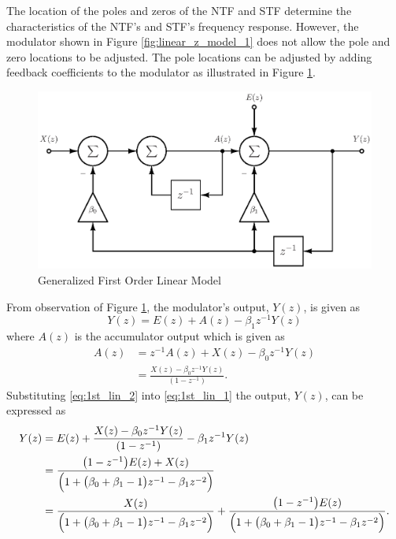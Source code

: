 The location of the poles and zeros of the NTF and STF determine the
characteristics of the NTF's and STF's frequency response. However, the \DS modulator
shown in Figure \ref{fig:linear_z_model_1} does not allow the pole and zero locations to
be adjusted. The pole locations can be adjusted by adding feedback
coefficients to the \DS modulator as illustrated in Figure \ref{fig:linear_z_model_2}.
\begin{figure}[htbp]
 \centering
 \includegraphics{./final_figures/first_order_linear_model.eps}
 \caption{Generalized First Order Linear Model}
 \label{fig:linear_z_model_2}
\end{figure}
From observation of Figure \ref{fig:linear_z_model_2}, the \DS
modulator's output, $Y(z)$, is given as
\begin{equation}\label{eq:1st_lin_1}
 Y(z)=E(z)+A(z)-\beta_{1}z^{-1}Y(z)
\end{equation}
where $A(z)$ is the accumulator output which is given as 
\begin{equation}\label{eq:1st_lin_2}
 \begin{split}
 A(z)& = z^{-1}A(z)+X(z)-\beta_{0}z^{-1}Y(z)\\
      &   = \frac{X(z)-\beta_{0}z^{-1}Y(z)}{\left(1-z^{-1}\right)}\text{.}
 \end{split}
\end{equation}
Substituting \eqref{eq:1st_lin_2} into \eqref{eq:1st_lin_1} the output,
$Y(z)$, can be expressed as 
\begin{equation}\label{eq:1st_lin_3}
  \begin{split}
  Y(z)& =
E(z)+\frac{X(z)-\beta_{0}z^{-1}Y(z)}{\left(1-z^{-1}\right)}-\beta_{1}z^{-1}Y(z)\\
        & =
\frac{\bigl(1-z^{-1}\bigr)E(z)+X(z)}{\Bigl(1+\bigl(\beta_{0}+\beta_{1}-1\bigr)z^{-1}
-\beta_{1}z^{-2}\Bigr)}\\
     & = \frac{X(z)}{\Bigl(1+\bigl(\beta_{0}+\beta_{1}-1\bigr)z^
{-1}-\beta_{1}z^{-2}\Bigr)}+\frac{\bigl(1-z^{-1}\bigr)E(z)}{\Bigl(1+\bigl(\beta_{0}
 +\beta_{1}-1\bigr)z^{-1}-\beta_{1}z^{-2}\Bigr)}\text{.}
 \end{split}
\end{equation}
